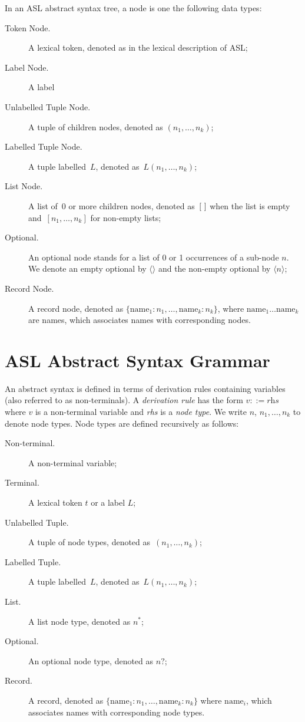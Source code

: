 \documentclass{book}
\begin{document}
In an ASL abstract syntax tree, a node is one the following data types:
\begin{description}
\item[Token Node.] A lexical token, denoted as in the lexical description of ASL;
\item[Label Node.] A label
\item[Unlabelled Tuple Node.] A tuple of children nodes, denoted as $(n_1,\ldots,n_k)$;
\item[Labelled Tuple Node.] A tuple labelled~$L$, denoted as~$L(n_1,\ldots,n_k)$;
\item[List Node.] A list of~$0$ or more children nodes, denoted as~$[\ ]$
when the list is empty and~$[n_1,\ldots,n_k]$ for non-empty lists;
\item[Optional.] An optional node stands for a list of 0 or 1 occurrences of a sub-node $n$. We denote an empty optional by $\langle\rangle$ and the non-empty optional by $\langle n \rangle$;
\item[Record Node.] A record node, denoted as $\{\text{name}_1 : n_1,\ldots,\text{name}_k : n_k\}$, where $\text{name}_1 \ldots \text{name}_k$ are names, which associates names with corresponding nodes.
\end{description}

\newpage

\section{ASL Abstract Syntax Grammar}

An abstract syntax is defined in terms of derivation rules containing variables (also referred to as non-terminals).
%
A \emph{derivation rule} has the form $v ::= \textit{rhs}$ where $v$ is a non-terminal variable and \textit{rhs} is a \emph{node type}. We write $n$, $n_1,\ldots,n_k$ to denote node types.
%
Node types are defined recursively as follows:
\begin{description}
\item[Non-terminal.] A non-terminal variable;
\item[Terminal.] A lexical token $t$ or a label $L$;
\item[Unlabelled Tuple.] A tuple of node types, denoted as~$(n_1,\ldots,n_k)$;
\item[Labelled Tuple.] A tuple labelled~$L$, denoted as~$L(n_1,\ldots,n_k)$;
\item[List.] A list node type, denoted as $n^{*}$;
\item[Optional.] An optional node type, denoted as $n?$;
\item[Record.] A record, denoted as $\{\text{name}_1 : n_1,\ldots,\text{name}_k : n_k\}$ where $\text{name}_i$, which associates names with corresponding node types.
\end{description}
\end{document}
